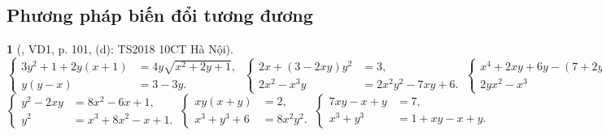\documentclass{article}
\newtheorem{baitoan}{}
\begin{document}
\subsection{Phương pháp biến đổi tương đương}

\begin{baitoan}[\cite{Kien_dai_so_9}, VD1, p. 101, (d): TS2018 10CT Hà Nội]
	\begin{equation*}
		\left\{\begin{split}
			3y^2 + 1 + 2y(x + 1) &= 4y\sqrt{x^2 + 2y + 1},\\
			y(y - x) &= 3 - 3y.
		\end{split}\right.\ \left\{\begin{split}
			2x + (3 - 2xy)y^2 &= 3,\\
			2x^2 - x^3y &= 2x^2y^2 - 7xy + 6.
		\end{split}\right.\ \left\{\begin{split}
			x^4 + 2xy + 6y - (7 + 2y)x^2 &= -9,\\
			2yx^2 - x^3 &= 10.
		\end{split}\right.
	\end{equation*}
	\begin{equation*}
		\left\{\begin{split}
			y^2 - 2xy &= 8x^2 - 6x + 1,\\
			y^2 &= x^3 + 8x^2 - x + 1.
		\end{split}\right.\ \left\{\begin{split}
			xy(x + y) &= 2,\\
			x^3 + y^3 + 6 &= 8x^2y^2.
		\end{split}\right.\ \left\{\begin{split}
			7xy - x + y &= 7,\\
			x^3 + y^3 &= 1 + xy - x + y.
		\end{split}\right.
	\end{equation*}
\end{baitoan}
\end{document}

